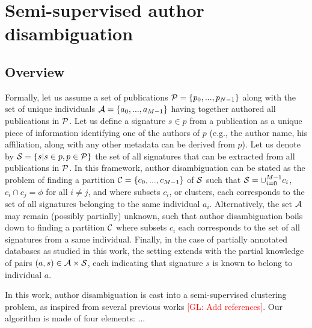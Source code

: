\documentclass{article}
\newcommand{\glnote}[1]{\textcolor{red}{[GL: #1]}}
\begin{document}

\section{Semi-supervised author disambiguation}
\label{methods}

\subsection{Overview}

Formally, let us assume a set of publications ${\cal P} = \{ p_0, ...,
p_{N-1}\}$ along with the set of unique individuals ${\cal A} = \{ a_0, ...,
a_{M-1}\}$ having together authored all publications in ${\cal P}$.  Let us
define a signature $s \in p$ from a publication as a unique piece of
information identifying one of the authors of $p$ (e.g., the author name, his
affiliation, along with any other metadata can be derived from $p$). Let us
denote by ${\cal S} = \{ s | s \in p, p \in {\cal P} \}$ the set of all
signatures that can be extracted from all publications in ${\cal P}$. In this
framework, author disambiguation can be stated as the problem of
finding a partition ${\cal C} = \{ c_0, ..., c_{M-1} \}$ of ${\cal S}$ such
that ${\cal S} = \cup_{i=0}^{M-1} c_i$, $c_i \cap c_j = \phi$ for all $i \neq
j$, and where subsets $c_i$, or clusters, each corresponds to the set of all
signatures belonging to the same individual $a_i$. Alternatively, the set
${\cal A}$ may remain (possibly partially) unknown, such that author
disambiguation boils down to finding a partition ${\cal C}$ where
subsets $c_i$  each corresponds to the set of all signatures from a same
individual. Finally, in the case of partially annotated databases as studied in
this work, the setting extends with the partial knowledge of pairs $(a, s) \in
{\cal A} \times {\cal S}$, each indicating that signature $s$ is known to
belong to individual $a$.

In this work, author disambiguation is cast into a semi-supervised clustering
problem, as inspired from several previous works \glnote{Add references}.
Our algorithm is made of four elements: ...
\end{document}
